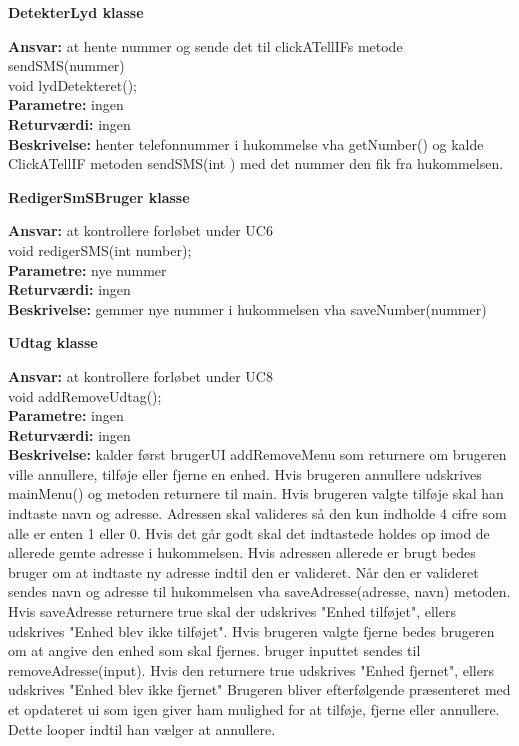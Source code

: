 {\centering 
\textbf{DetekterLyd klasse}\par
}
\textbf{Ansvar:} at hente nummer og sende det til clickATellIFs metode sendSMS(nummer) \\

void lydDetekteret(); \\
\textbf{Parametre:} ingen \\
\textbf{Returværdi:} ingen \\
\textbf{Beskrivelse:} henter telefonnummer i hukommelse vha getNumber() og kalde ClickATellIF metoden sendSMS(int ) med det nummer den fik fra hukommelsen. \\

{\centering 
\textbf{RedigerSmSBruger klasse}\par
}
\textbf{Ansvar:} at kontrollere forløbet under UC6 \\

void redigerSMS(int number); \\
\textbf{Parametre:} nye nummer \\
\textbf{Returværdi:} ingen \\
\textbf{Beskrivelse:} gemmer nye nummer i hukommelsen vha saveNumber(nummer) \\

{\centering 
\textbf{Udtag klasse}\par
}
\textbf{Ansvar:} at kontrollere forløbet under UC8 \\

void addRemoveUdtag(); \\
\textbf{Parametre:} ingen \\
\textbf{Returværdi:} ingen \\
\textbf{Beskrivelse:} kalder først brugerUI addRemoveMenu som returnere om brugeren ville annullere, tilføje eller fjerne en enhed. Hvis brugeren annullere udskrives mainMenu() og metoden returnere til main. 
\newline Hvis brugeren valgte tilføje skal han indtaste navn og adresse. Adressen skal valideres så den kun indholde 4 cifre som alle er enten 1 eller 0. Hvis det går godt skal det indtastede holdes op imod de allerede gemte adresse i hukommelsen. Hvis adressen allerede er brugt bedes bruger om at indtaste ny adresse indtil den er valideret. Når den er valideret sendes navn og adresse til hukommelsen vha saveAdresse(adresse, navn) metoden. Hvis saveAdresse returnere true skal der udskrives "Enhed tilføjet", ellers udskrives "Enhed blev ikke tilføjet".
\newline Hvis brugeren valgte fjerne bedes brugeren om at angive den enhed som skal fjernes. bruger inputtet sendes til removeAdresse(input). Hvis den returnere true udskrives "Enhed fjernet", ellers udskrives "Enhed blev ikke fjernet"
\newline Brugeren bliver efterfølgende præsenteret med et opdateret ui som igen giver ham mulighed for at tilføje, fjerne eller annullere. Dette looper indtil han vælger at annullere.\\

